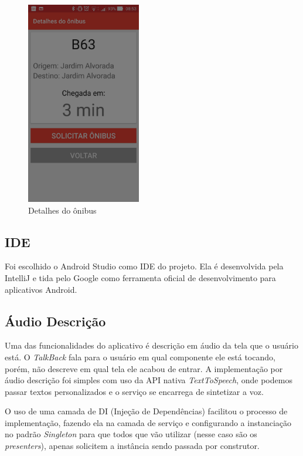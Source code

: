 \documentclass[
	12pt,				%
	oneside,			%
	a4paper,			%
	brazil				%
]{abntex2}
\begin{document}
{\begin{figure}[H]
\centering
\begin{minipage}{.5\textwidth}
  \centering
  \includegraphics[width=5cm]{images/beacon_detail_bus}
  \caption{Detalhes do ônibus}
  \label{Rotulo}
\end{minipage}%
\end{figure}

\newpage

\subsection{IDE}

Foi escolhido o Android Studio como IDE do projeto. Ela é desenvolvida pela IntelliJ e tida pelo Google como ferramenta oficial de desenvolvimento para aplicativos Android.

\subsection{Áudio Descrição}

Uma das funcionalidades do aplicativo é descrição em áudio da tela que o usuário está. O \textit{TalkBack} fala para o usuário em qual componente ele está tocando, porém, não descreve em qual tela ele acabou de entrar. 
A implementação por áudio descrição foi simples com uso da API nativa \textit{TextToSpeech}, onde podemos passar textos personalizados e o serviço se encarrega de sintetizar a voz.

O uso de uma camada de DI (Injeção de Dependências) facilitou o processo de implementação, fazendo ela na camada de serviço e configurando a instanciação no padrão \textit{Singleton} para que todos que vão utilizar (nesse caso são os \textit{presenters}), apenas solicitem a instância sendo passada por construtor.

}
\end{document}
